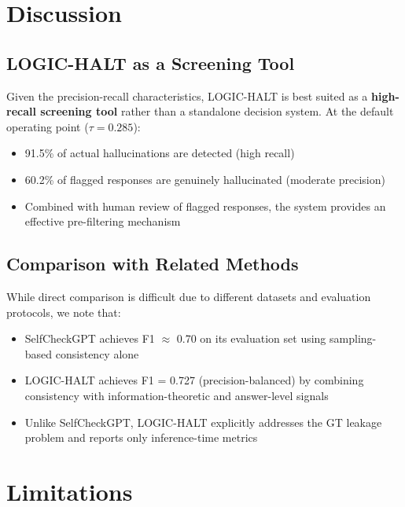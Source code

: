 \section{Discussion}

\subsection{LOGIC-HALT as a Screening Tool}

Given the precision-recall characteristics, LOGIC-HALT is best suited as a \textbf{high-recall screening tool} rather than a standalone decision system. At the default operating point ($\tau = 0.285$):

\begin{itemize}
    \item 91.5\% of actual hallucinations are detected (high recall)
    \item 60.2\% of flagged responses are genuinely hallucinated (moderate precision)
    \item Combined with human review of flagged responses, the system provides an effective pre-filtering mechanism
\end{itemize}

\subsection{Comparison with Related Methods}

While direct comparison is difficult due to different datasets and evaluation protocols, we note that:

\begin{itemize}
    \item SelfCheckGPT \cite{manakul2023selfcheckgpt} achieves F1 $\approx$ 0.70 on its evaluation set using sampling-based consistency alone
    \item LOGIC-HALT achieves F1 = 0.727 (precision-balanced) by combining consistency with information-theoretic and answer-level signals
    \item Unlike SelfCheckGPT, LOGIC-HALT explicitly addresses the GT leakage problem and reports only inference-time metrics
\end{itemize}

\section{Limitations}

